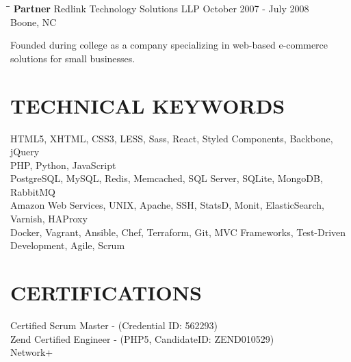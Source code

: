 \documentclass{res}
\begin{document}
\begin{resume}
    \begin{tabbing}%
   \hspace{2.3in}\= \hspace{2.6in}\= \kill %
   {\bf Partner}  \>Redlink Technology Solutions LLP \> October 2007 - July 2008\\
                          \>Boone, NC
   \end{tabbing}\vspace{-10pt}
    Founded during college as a company specializing in web-based e-commerce solutions for small businesses.

\section{TECHNICAL KEYWORDS}

    HTML5, XHTML, CSS3, LESS, Sass, React, Styled Components, Backbone, jQuery \\
    PHP, Python, JavaScript \\
    PostgreSQL, MySQL, Redis, Memcached, SQL Server, SQLite, MongoDB, RabbitMQ \\
    Amazon Web Services, UNIX, Apache, SSH, StatsD, Monit, ElasticSearch, Varnish, HAProxy \\
    Docker, Vagrant, Ansible, Chef, Terraform, Git, MVC Frameworks, Test-Driven Development, Agile, Scrum


\section{CERTIFICATIONS}
    Certified Scrum Master - (Credential ID: 562293) \\
    Zend Certified Engineer - (PHP5, CandidateID: ZEND010529) \\
    Network+

\end{resume}
\end{document}
